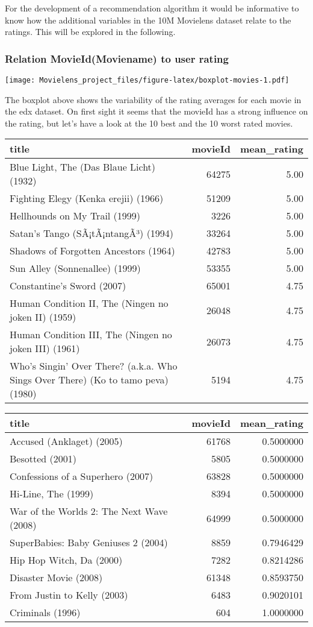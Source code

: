 \documentclass[
]{article}
\begin{document}
For the development of a recommendation algorithm it would be
informative to know how the additional variables in the 10M Movielens
dataset relate to the ratings. This will be explored in the following.

\hypertarget{relation-movieidmoviename-to-user-rating}{%
\subsubsection{Relation MovieId(Moviename) to user
rating}\label{relation-movieidmoviename-to-user-rating}}

\texttt{[image: Movielens\_project\_files/figure-latex/boxplot-movies-1.pdf]}

The boxplot above shows the variability of the rating averages for each
movie in the edx dataset. On first sight it seems that the movieId has a
strong influence on the rating, but let's have a look at the 10 best and
the 10 worst rated movies.

\begin{longtable}[]{@{}lrr@{}}
\toprule
title & movieId & mean\_rating\tabularnewline
\midrule
\endhead
Blue Light, The (Das Blaue Licht) (1932) & 64275 & 5.00\tabularnewline
Fighting Elegy (Kenka erejii) (1966) & 51209 & 5.00\tabularnewline
Hellhounds on My Trail (1999) & 3226 & 5.00\tabularnewline
Satan's Tango (SÃ¡tÃ¡ntangÃ³) (1994) & 33264 & 5.00\tabularnewline
Shadows of Forgotten Ancestors (1964) & 42783 & 5.00\tabularnewline
Sun Alley (Sonnenallee) (1999) & 53355 & 5.00\tabularnewline
Constantine's Sword (2007) & 65001 & 4.75\tabularnewline
Human Condition II, The (Ningen no joken II) (1959) & 26048 &
4.75\tabularnewline
Human Condition III, The (Ningen no joken III) (1961) & 26073 &
4.75\tabularnewline
Who's Singin' Over There? (a.k.a. Who Sings Over There) (Ko to tamo
peva) (1980) & 5194 & 4.75\tabularnewline
\bottomrule
\end{longtable}

\begin{longtable}[]{@{}lrr@{}}
\toprule
title & movieId & mean\_rating\tabularnewline
\midrule
\endhead
Accused (Anklaget) (2005) & 61768 & 0.5000000\tabularnewline
Besotted (2001) & 5805 & 0.5000000\tabularnewline
Confessions of a Superhero (2007) & 63828 & 0.5000000\tabularnewline
Hi-Line, The (1999) & 8394 & 0.5000000\tabularnewline
War of the Worlds 2: The Next Wave (2008) & 64999 &
0.5000000\tabularnewline
SuperBabies: Baby Geniuses 2 (2004) & 8859 & 0.7946429\tabularnewline
Hip Hop Witch, Da (2000) & 7282 & 0.8214286\tabularnewline
Disaster Movie (2008) & 61348 & 0.8593750\tabularnewline
From Justin to Kelly (2003) & 6483 & 0.9020101\tabularnewline
Criminals (1996) & 604 & 1.0000000\tabularnewline
\bottomrule
\end{longtable}
\end{document}
